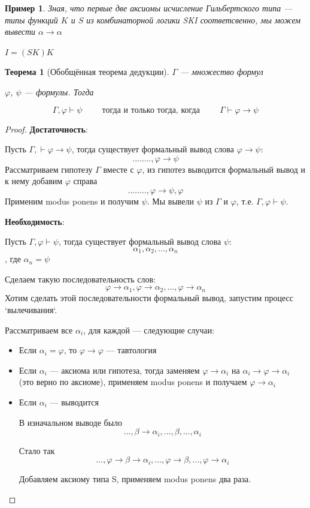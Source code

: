 \documentclass[12pt]{article}
\newtheorem{theorem}{Теорема}
\newtheorem{example}{Пример}
\begin{document}
\begin{example}
	Зная, что первые две аксиомы исчисление Гильбертского типа --- типы функций $K$ и $S$ из комбинаторной логики SKI соответсвенно, мы можем вывести $\alpha \rightarrow \alpha$

	$I = (SK)K$
\end{example}

\begin{theorem}[Обобщённая теорема дедукции]
	$\Gamma$ --- множество формул

	$\varphi$, $\psi$ --- формулы. Тогда

	\[ \Gamma, \varphi \vdash \psi \hspace{1cm} \text{тогда и только тогда, когда} \hspace{1cm} \Gamma \vdash \varphi \to \psi\]
\end{theorem}
\begin{proof}
	\textbf{Достаточность}:

	Пусть $\Gamma, \vdash \varphi \rightarrow \psi$, тогда существует формальный вывод слова $\varphi \rightarrow \psi$:
	\[........, \varphi \rightarrow \psi\] Рассматриваем гипотезу $\Gamma$ вместе с $\varphi$, из гипотез выводится формальный вывод и к нему добавим $\varphi$ справа
	\[........, \varphi \rightarrow \psi, \varphi\]
	Применим modus ponens и получим $\psi$. Мы вывели $\psi$ из $\Gamma$ и $ \varphi$, т.е. $\Gamma, \varphi \vdash \psi$.

	\textbf{Необходимость}:

	Пусть $\Gamma, \varphi \vdash \psi$, тогда существует формальный вывод слова $\psi$:
	\[ \alpha_1 , \alpha_2, ..., \alpha_n\]
	, где $\alpha_n = \psi$

	Сделаем такую последовательность слов:
	\[ \varphi \rightarrow \alpha_1 , \varphi \rightarrow \alpha_2, ..., \varphi \rightarrow \alpha_n\]
	Хотим сделать этой последовательности формальный вывод, запустим процесс `вылечивания`.

	Рассматриваем все $\alpha_i$, для каждой --- следующие случаи:
	\begin{itemize}
		\item Если $\alpha_i = \varphi$, то $\varphi \rightarrow \varphi$ --- тавтология
		\item Если $\alpha_i$ --- аксиома или гипотеза, тогда заменяем $\varphi \rightarrow \alpha_i$  на $\alpha_i \rightarrow \varphi \rightarrow \alpha_i$ (это верно по аксиоме), применяем modus ponens и получаем $\varphi \rightarrow \alpha_i$
		\item Если $\alpha_i$ --- выводится

		      В изначальном выводе было
		      \[ ... ,\beta \to \alpha_i, ..., \beta, ..., \alpha_i\]

		      Стало так
		      \[ ... ,\varphi \to \beta \to \alpha_i, ..., \varphi \to \beta, ..., \varphi \to \alpha_i\]

		      Добавляем аксиому типа S, применяем modus ponens два раза.

	\end{itemize}
\end{proof}
\end{document}
